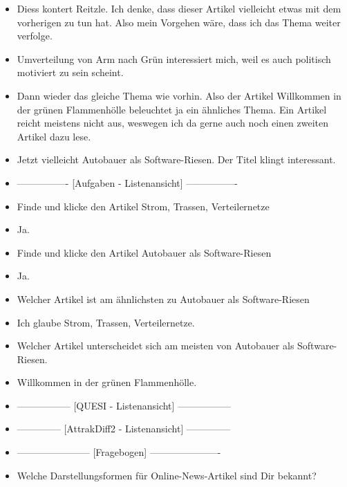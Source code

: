 {\begin{itemize}[]
              Ich würde mich jetzt gerne informieren welchen Zwang das bedeutet und wer dahinter steckt.
        \item {} \flqq Diess kontert Reitzle\frqq{}. Ich denke, dass dieser Artikel vielleicht etwas mit dem vorherigen zu tun hat.
              Also mein Vorgehen wäre, dass ich das Thema weiter verfolge.
        \item {} \flqq Umverteilung von Arm nach Grün\frqq{} interessiert mich, weil es auch politisch motiviert zu sein scheint.
        \item {} Dann wieder das gleiche Thema wie vorhin.
              Also der Artikel \flqq Willkommen in der grünen Flammenhölle\frqq{} beleuchtet ja ein ähnliches Thema.
              Ein Artikel reicht meistens nicht aus, weswegen ich da gerne auch noch einen zweiten Artikel dazu lese.
        \item {} Jetzt vielleicht \flqq Autobauer als Software-Riesen\frqq{}.
              Der Titel klingt interessant.
        \item {----------------} [Aufgaben - Listenansicht] {----------------}
        \item {} Finde und klicke den Artikel \flqq Strom, Trassen, Verteilernetze\frqq{}
        \item {} Ja.
        \item {} Finde und klicke den Artikel \flqq Autobauer als Software-Riesen\frqq{}
        \item {} Ja.
        \item {} Welcher Artikel ist am ähnlichsten zu \flqq Autobauer als Software-Riesen\frqq{}
        \item {} Ich glaube \flqq Strom, Trassen, Verteilernetze\frqq{}.
        \item {} Welcher Artikel unterscheidet sich am meisten von \flqq Autobauer als Software-Riesen\frqq{}.
        \item {} \flqq Willkommen in der grünen Flammenhölle\frqq{}.
        \item {-----------------} [QUESI - Listenansicht] {-----------------}
        \item {--------------} [AttrakDiff2 - Listenansicht] {--------------}
        \item {-----------------------} [Fragebogen] {----------------------}
        \item {} Welche Darstellungsformen für Online-News-Artikel sind Dir bekannt?

\end{itemize}}
